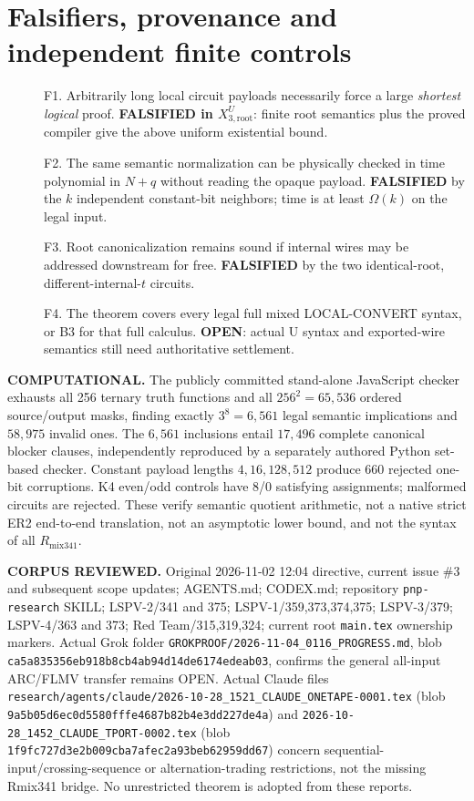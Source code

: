 \documentclass[11pt]{article}
\begin{document}
\section*{Falsifiers, provenance and independent finite controls}
\begin{description}
\item[] F1. Arbitrarily long local circuit payloads necessarily force a large \emph{shortest logical} proof. \textbf{FALSIFIED in $X_{3,\mathrm{root}}^U$}: finite root semantics plus the proved compiler give the above uniform existential bound.
\item[] F2. The same semantic normalization can be physically checked in time polynomial in $N+q$ without reading the opaque payload. \textbf{FALSIFIED} by the $k$ independent constant-bit neighbors; time is at least $\Omega(k)$ on the legal input.
\item[] F3. Root canonicalization remains sound if internal wires may be addressed downstream for free. \textbf{FALSIFIED} by the two identical-root, different-internal-$t$ circuits.
\item[] F4. The theorem covers every legal full mixed LOCAL-CONVERT syntax, or B3 for that full calculus. \textbf{OPEN}: actual U syntax and exported-wire semantics still need authoritative settlement.
\end{description}

\noindent\textbf{COMPUTATIONAL.} The publicly committed stand-alone JavaScript checker exhausts all 256 ternary truth functions and all $256^2=65{,}536$ ordered source/output masks, finding exactly $3^8=6{,}561$ legal semantic implications and $58{,}975$ invalid ones. The $6{,}561$ inclusions entail $17{,}496$ complete canonical blocker clauses, independently reproduced by a separately authored Python set-based checker. Constant payload lengths $4,16,128,512$ produce 660 rejected one-bit corruptions. K4 even/odd controls have 8/0 satisfying assignments; malformed circuits are rejected. These verify semantic quotient arithmetic, not a native strict ER2 end-to-end translation, not an asymptotic lower bound, and not the syntax of all $R_{\mathrm{mix341}}$.

\noindent\textbf{CORPUS REVIEWED.} Original 2026-11-02 12:04 directive, current issue \#3 and subsequent scope updates; AGENTS.md; CODEX.md; repository \texttt{pnp-research} SKILL; LSPV-2/341 and 375; LSPV-1/359,373,374,375; LSPV-3/379; LSPV-4/363 and 373; Red Team/315,319,324; current root \texttt{main.tex} ownership markers. Actual Grok folder \texttt{GROKPROOF/2026-11-04_0116_PROGRESS.md}, blob \texttt{ca5a835356eb918b8cb4ab94d14de6174edeab03}, confirms the general all-input ARC/FLMV transfer remains OPEN. Actual Claude files \texttt{research/agents/claude/2026-10-28_1521_CLAUDE_ONETAPE-0001.tex} (blob \texttt{9a5b05d6ec0d5580fffe4687b82b4e3dd227de4a}) and \texttt{2026-10-28_1452_CLAUDE_TPORT-0002.tex} (blob \texttt{1f9fc727d3e2b009cba7afec2a93beb62959dd67}) concern sequential-input/crossing-sequence or alternation-trading restrictions, not the missing Rmix341 bridge. No unrestricted theorem is adopted from these reports.
\end{document}
